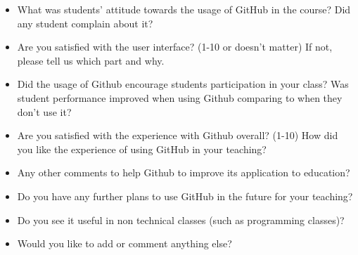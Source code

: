 \begin{itemize}
    \item What was students' attitude towards the usage of GitHub in the course? Did any student complain about it?
    \item Are you satisfied with the user interface? (1-10 or doesn't matter) If not, please tell us which part and why.
    \item Did the usage of Github encourage students participation in your class? Was student performance improved when using Github comparing to when they don't use it?
    \item Are you satisfied with the experience with Github overall? (1-10) How did you like the experience of using GitHub in your teaching?
    \item Any other comments to help Github to improve its application to education?
    \item Do you have any further plans to use GitHub in the future for your teaching?
    \item Do you see it useful in non technical classes (such as programming classes)?
    \item Would you like to add or comment anything else?
\end{itemize}

